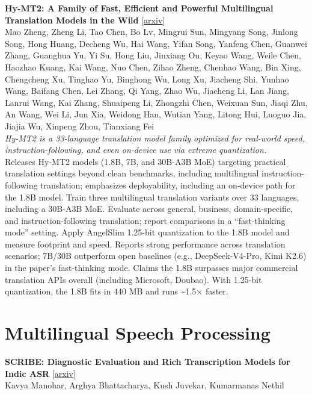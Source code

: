 \documentclass[12pt,letterpaper]{article}
\begin{document}
\medskip

{\small\textbf{Hy-MT2: A Family of Fast, Efficient and Powerful Multilingual Translation Models in the Wild}} {\scriptsize[\href{https://arxiv.org/abs/2605.22064}{arxiv}]}\\
{\scriptsize Mao Zheng, Zheng Li, Tao Chen, Bo Lv, Mingrui Sun, Mingyang Song, Jinlong Song, Hong Huang, Decheng Wu, Hai Wang, Yifan Song, Yanfeng Chen, Guanwei Zhang, Guanghua Yu, Yi Su, Hong Liu, Jinxiang Ou, Keyao Wang, Weile Chen, Haozhao Kuang, Kai Wang, Nuo Chen, Zihao Zheng, Chenhao Wang, Bin Xing, Chengcheng Xu, Tinghao Yu, Binghong Wu, Long Xu, Jiacheng Shi, Yunhao Wang, Baifang Chen, Lei Zhang, Qi Yang, Zhao Wu, Jiacheng Li, Lan Jiang, Lanrui Wang, Kai Zhang, Shuaipeng Li, Zhongzhi Chen, Weixuan Sun, Jiaqi Zhu, An Wang, Wei Li, Jun Xia, Weidong Han, Wutian Yang, Litong Hui, Luoguo Jia, Jiajia Wu, Xinpeng Zhou, Tianxiang Fei}\\

{\small\textit{Hy-MT2 is a 33-language translation model family optimized for real-world speed, instruction-following, and even on-device use via extreme quantization.}}\\[1pt]
{\footnotesize Releases Hy-MT2 models (1.8B, 7B, and 30B-A3B MoE) targeting practical translation settings beyond clean benchmarks, including multilingual instruction-following translation; emphasizes deployability, including an on-device path for the 1.8B model. Train three multilingual translation variants over 33 languages, including a 30B-A3B MoE. Evaluate across general, business, domain-specific, and instruction-following translation; report comparisons in a ``fast-thinking mode'' setting. Apply AngelSlim 1.25-bit quantization to the 1.8B model and measure footprint and speed. Reports strong performance across translation scenarios; 7B/30B outperform open baselines (e.g., DeepSeek-V4-Pro, Kimi K2.6) in the paper's fast-thinking mode. Claims the 1.8B surpasses major commercial translation APIs overall (including Microsoft, Doubao). With 1.25-bit quantization, the 1.8B fits in 440 MB and runs \textasciitilde{}1.5× faster.}

\medskip


\section*{Multilingual Speech Processing}

{\small\textbf{SCRIBE: Diagnostic Evaluation and Rich Transcription Models for Indic ASR}} {\scriptsize[\href{https://arxiv.org/abs/2605.20712}{arxiv}]}\\
{\scriptsize Kavya Manohar, Arghya Bhattacharya, Kush Juvekar, Kumarmanas Nethil}\\
\end{document}
